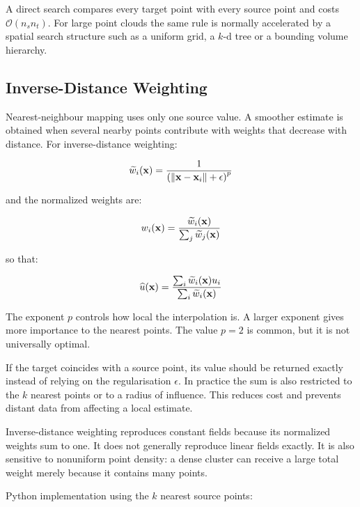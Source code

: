 A direct search compares every target point with every source point and costs
$ \mathcal{O}(n_s n_t) $. For large point clouds the same rule is normally
accelerated by a spatial search structure such as a uniform grid, a $k$-d tree
or a bounding volume hierarchy.

\subsection{Inverse-Distance Weighting}

Nearest-neighbour mapping uses only one source value. A smoother estimate is
obtained when several nearby points contribute with weights that decrease with
distance. For inverse-distance weighting:

\begin{equation}
    \widetilde{w}_i(\mathbf{x}) =
    \frac{1}{\left(\| {\mathbf{x}-\mathbf{x}_i} \|+\epsilon\right)^p}
\end{equation}

and the normalized weights are:

\begin{equation}
    w_i(\mathbf{x}) =
    \frac{\widetilde{w}_i(\mathbf{x})}
         {\sum_j \widetilde{w}_j(\mathbf{x})}
\end{equation}

so that:

\begin{equation}
    \widehat{u}(\mathbf{x}) =
    \frac{\sum_i \widetilde{w}_i(\mathbf{x}) u_i}
         {\sum_i \widetilde{w}_i(\mathbf{x})}
\end{equation}

The exponent $ p $ controls how local the interpolation is. A larger exponent
gives more importance to the nearest points. The value $ p=2 $ is common, but
it is not universally optimal.

If the target coincides with a source point, its value should be returned
exactly instead of relying on the regularisation $ \epsilon $. In practice the
sum is also restricted to the $ k $ nearest points or to a radius of influence.
This reduces cost and prevents distant data from affecting a local estimate.

Inverse-distance weighting reproduces constant fields because its normalized
weights sum to one. It does not generally reproduce linear fields exactly. It
is also sensitive to nonuniform point density: a dense cluster can receive a
large total weight merely because it contains many points.

Python implementation using the $ k $ nearest source points:

